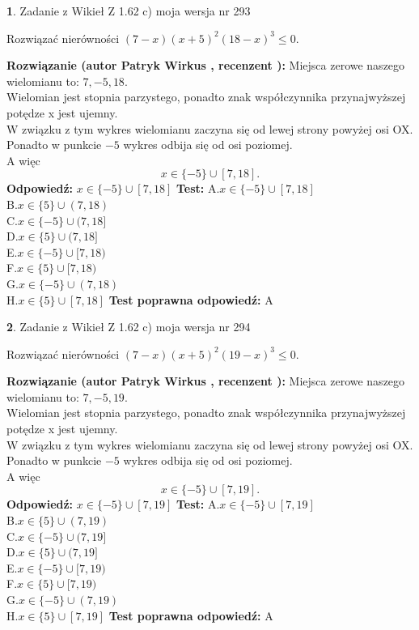 \documentclass[12pt, a4paper]{article}
\theoremstyle{definition} %
\newtheorem{zad}{}
\newcommand{\zadStart}[1]{\begin{zad}#1\newline}
\newcommand{\zadStop}{\end{zad}}
\newcommand{\rozwStart}[2]{\noindent \textbf{Rozwiązanie (autor #1 , recenzent #2): }\newline}
\newcommand{\rozwStop}{\newline}
\newcommand{\odpStart}{\noindent \textbf{Odpowiedź:}\newline}
\newcommand{\odpStop}{\newline}
\newcommand{\testStart}{\noindent \textbf{Test:}\newline}
\newcommand{\testStop}{\newline}
\newcommand{\kluczStart}{\noindent \textbf{Test poprawna odpowiedź:}\newline}
\newcommand{\kluczStop}{\newline}
\begin{document}
\zadStart{Zadanie z Wikieł Z 1.62 c) moja wersja nr 293}

Rozwiązać nierówności $(7-x)(x+5)^{2}(18-x)^{3}\le0$.
\zadStop
\rozwStart{Patryk Wirkus}{}
Miejsca zerowe naszego wielomianu to: $7, -5, 18$.\\
Wielomian jest stopnia parzystego, ponadto znak współczynnika przy\linebreak najwyższej potędze x jest ujemny.\\ W związku z tym wykres wielomianu zaczyna się od lewej strony powyżej osi OX.\\
Ponadto w punkcie $-5$ wykres odbija się od osi poziomej.\\
A więc $$x \in \{-5\} \cup [7,18].$$
\rozwStop
\odpStart
$x \in \{-5\} \cup [7,18]$
\odpStop
\testStart
A.$x \in \{-5\} \cup [7,18]$\\
B.$x \in \{5\} \cup (7,18)$\\
C.$x \in \{-5\} \cup (7,18]$\\
D.$x \in \{5\} \cup (7,18]$\\
E.$x \in \{-5\} \cup [7,18)$\\
F.$x \in \{5\} \cup [7,18)$\\
G.$x \in \{-5\} \cup (7,18)$\\
H.$x \in \{5\} \cup [7,18]$
\testStop
\kluczStart
A
\kluczStop



\zadStart{Zadanie z Wikieł Z 1.62 c) moja wersja nr 294}

Rozwiązać nierówności $(7-x)(x+5)^{2}(19-x)^{3}\le0$.
\zadStop
\rozwStart{Patryk Wirkus}{}
Miejsca zerowe naszego wielomianu to: $7, -5, 19$.\\
Wielomian jest stopnia parzystego, ponadto znak współczynnika przy\linebreak najwyższej potędze x jest ujemny.\\ W związku z tym wykres wielomianu zaczyna się od lewej strony powyżej osi OX.\\
Ponadto w punkcie $-5$ wykres odbija się od osi poziomej.\\
A więc $$x \in \{-5\} \cup [7,19].$$
\rozwStop
\odpStart
$x \in \{-5\} \cup [7,19]$
\odpStop
\testStart
A.$x \in \{-5\} \cup [7,19]$\\
B.$x \in \{5\} \cup (7,19)$\\
C.$x \in \{-5\} \cup (7,19]$\\
D.$x \in \{5\} \cup (7,19]$\\
E.$x \in \{-5\} \cup [7,19)$\\
F.$x \in \{5\} \cup [7,19)$\\
G.$x \in \{-5\} \cup (7,19)$\\
H.$x \in \{5\} \cup [7,19]$
\testStop
\kluczStart
A
\kluczStop
\end{document}
